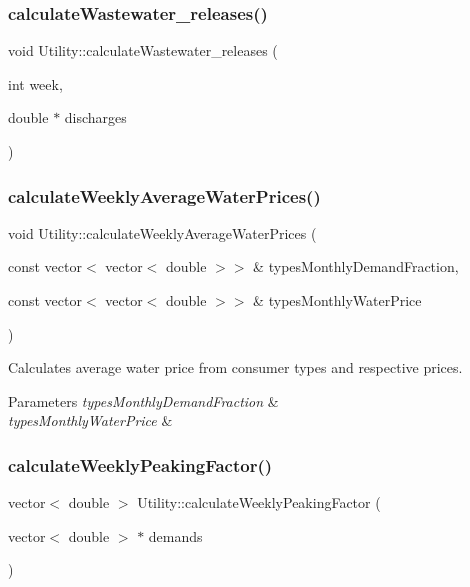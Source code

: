 \subsubsection{\texorpdfstring{calculate\+Wastewater\+\_\+releases()}{calculateWastewater\_releases()}}
{\footnotesize\ttfamily void Utility\+::calculate\+Wastewater\+\_\+releases (\begin{DoxyParamCaption}\item[{int}]{week,  }\item[{double $\ast$}]{discharges }\end{DoxyParamCaption})}

\mbox{\label{classUtility_a0189edb631c9596f094b15afeeb934fd}} 
\subsubsection{\texorpdfstring{calculate\+Weekly\+Average\+Water\+Prices()}{calculateWeeklyAverageWaterPrices()}}
{\footnotesize\ttfamily void Utility\+::calculate\+Weekly\+Average\+Water\+Prices (\begin{DoxyParamCaption}\item[{const vector$<$ vector$<$ double $>$$>$ \&}]{types\+Monthly\+Demand\+Fraction,  }\item[{const vector$<$ vector$<$ double $>$$>$ \&}]{types\+Monthly\+Water\+Price }\end{DoxyParamCaption})}

Calculates average water price from consumer types and respective prices. 
\begin{DoxyParams}{Parameters}
{\em types\+Monthly\+Demand\+Fraction} & \\
\hline
{\em types\+Monthly\+Water\+Price} & \\
\hline
\end{DoxyParams}
\mbox{\label{classUtility_a7e1a1362011b8b57d68fb69f17d773ae}} 
\subsubsection{\texorpdfstring{calculate\+Weekly\+Peaking\+Factor()}{calculateWeeklyPeakingFactor()}}
{\footnotesize\ttfamily vector$<$ double $>$ Utility\+::calculate\+Weekly\+Peaking\+Factor (\begin{DoxyParamCaption}\item[{vector$<$ double $>$ $\ast$}]{demands }\end{DoxyParamCaption})}

